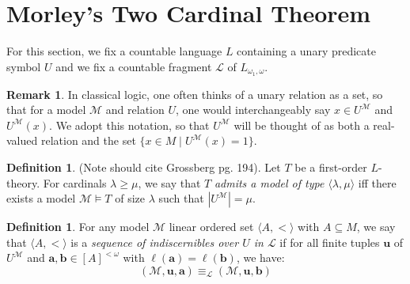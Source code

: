 \documentclass{amsart}
\theoremstyle{definition}
\newtheorem{remark}[theorem]{Remark}
\newtheorem{definition}[theorem]{Definition}
\numberwithin{equation}{theorem}
\newcommand{\V}{\mathbf}
\newcommand{\where}{\mid}
\newcommand{\len}{\ell}
\newcommand{\frag}{\mathcal{L}}
\begin{document}
\section{Morley's Two Cardinal Theorem}
  For this section, we fix a countable language $L$ containing a unary predicate symbol $U$ and we fix a countable fragment $\mathcal L$ of $L_{\omega_1,\omega}$.
  \begin{remark}
    In classical logic, one often thinks of a unary relation as a set, so that for a model $\mathcal M$ and relation $U$, one would interchangeably say $x\in U^\mathcal M$ and $U^\mathcal M(x)$.
    We adopt this notation, so that $U^\mathcal M$ will be thought of as both a real-valued relation and the set $\{x\in M\where U^\mathcal M(x)=1\}$.
  \end{remark}
  \begin{definition}
    (Note should cite Grossberg pg. 194).
    Let $T$ be a first-order $L$-theory.
    For cardinals $\lambda\geq \mu$, we say that $T$ \emph{admits a model of type $\langle\lambda,\mu\rangle$} iff there exists a model $\mathcal M\models T$ of size $\lambda$ such that $|U^\mathcal M|=\mu$.
  \end{definition}
  \begin{definition}
    For any model $\mathcal M$ linear ordered set $\langle A,<\rangle$ with $A\subseteq M$, we say that $\langle A,<\rangle$ is a \emph{sequence of indiscernibles over $U$ in $\frag$} if for all finite tuples $\V u$ of $U^\mathcal M$ and $\V a,\V b\in [A]^{<\omega}$ with $\len(\V a)=\len(\V b)$, we have:
    \[
      (\mathcal M, \V u, \V a)\equiv_\frag (\mathcal M,\V u, \V b)
    \]
  \end{definition}
\end{document}
